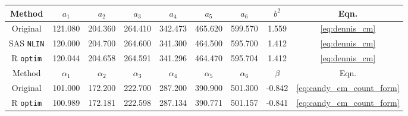 
\begin{tabular}{ccccccccc}
\toprule
Method & $a_1$ & $a_2$ & $a_3$ & $a_4$ & $a_5$ & $a_6$ & $b^2$ & Eqn.\\
\midrule
Original \citep{kemp1986stochastic} & 121.080 & 204.360 & 264.410 & 342.473 & 465.620 & 599.570 & 1.559 & \ref{eq:dennis_cm}\\
SAS \verb+NLIN+ & 120.000 & 204.700 & 264.600 & 341.300 & 464.500 & 595.700 & 1.412 & \ref{eq:dennis_cm}\\
R \verb+optim+ & 120.044 & 204.658 & 264.591 & 341.296 & 464.470 & 595.704 & 1.412 & \ref{eq:dennis_cm}\\
\midrule Method & $\alpha_1$ & $\alpha_2$ & $\alpha_3$ & $\alpha_4$ & $\alpha_5$ & $\alpha_6$ & $\beta$ & Eqn. \\ \midrule
Original \citep{candy1991modeling} & 101.000 & 172.200 & 222.700 & 287.200 & 390.900 & 501.300 & -0.842 & \ref{eq:candy_cm_count_form}\\
R \verb+optim+ & 100.989 & 172.181 & 222.598 & 287.134 & 390.771 & 501.157 & -0.841 & \ref{eq:candy_cm_count_form}\\
\bottomrule
\end{tabular}